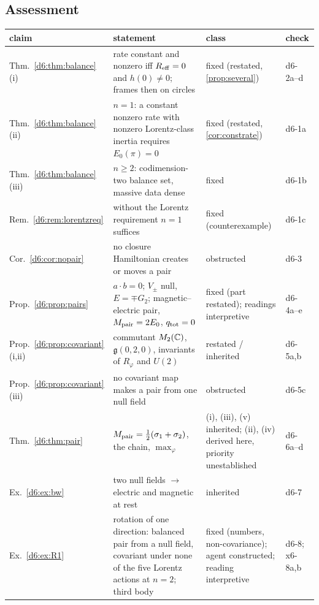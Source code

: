 \subsection{Assessment}
\label{d6:sec:assess}

\begin{table}[t]
\centering
\small
\begin{tabular}{@{}>{\raggedright\arraybackslash}p{2.7cm}>{\raggedright\arraybackslash}p{7.2cm}>{\raggedright\arraybackslash}p{3.2cm}>{\raggedright\arraybackslash}p{1.4cm}@{}}
\toprule
claim & statement & class & check\\
\midrule
Thm.~\ref{d6:thm:balance}(i) & rate constant and nonzero iff $R_{\rm eff}=0$ and $h(0)\neq0$; frames then on circles & fixed (restated, \cref{prop:several}) & d6-2a--d\\
Thm.~\ref{d6:thm:balance}(ii) & $n=1$: a constant nonzero rate with nonzero Lorentz-class inertia requires $E_0(\pi)=0$ & fixed (restated, \cref{cor:constrate}) & d6-1a\\
Thm.~\ref{d6:thm:balance}(iii) & $n\ge2$: codimension-two balance set, massive data dense & fixed & d6-1b\\
Rem.~\ref{d6:rem:lorentzreq} & without the Lorentz requirement $n=1$ suffices & fixed (counterexample) & d6-1c\\
Cor.~\ref{d6:cor:nopair} & no closure Hamiltonian creates or moves a pair & obstructed & d6-3\\
Prop.~\ref{d6:prop:pairs} & $a\cdot b=0$; $V_\pm$ null, $E=\mp G_2$; magnetic--electric pair, $M_{\rm pair}=2E_0$, $q_{\rm tot}=0$ & fixed (part restated); readings interpretive & d6-4a--e\\
Prop.~\ref{d6:prop:covariant}(i,ii) & commutant $M_2(\mathbb{C})$, $\mathfrak g(0,2,0)$, invariants of $R_\varphi$ and $U(2)$ & restated / inherited & d6-5a,b\\
Prop.~\ref{d6:prop:covariant}(iii) & no covariant map makes a pair from one null field & obstructed & d6-5c\\
Thm.~\ref{d6:thm:pair} & $M_{\rm pair}=\tfrac12(\sigma_1+\sigma_2)$, the chain, $\max_\varphi$ & (i), (iii), (v) inherited; (ii), (iv) derived here, priority unestablished & d6-6a--d\\
Ex.~\ref{d6:ex:bw} & two null fields $\to$ electric and magnetic at rest & inherited & d6-7\\
Ex.~\ref{d6:ex:R1} & rotation of one direction: balanced pair from a null field, covariant under none of the five Lorentz actions at $n=2$; third body & fixed (numbers, non-covariance); agent constructed; reading interpretive & d6-8; x6-8a,b\\

\end{tabular}
\end{table}
